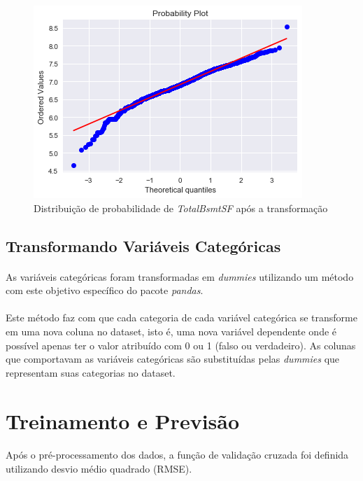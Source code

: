 \documentclass{article}
\begin{document}
			\begin{figure}[H]
				\centering
				\includegraphics[scale=0.8]{../img/totalbsmtsf_norm_after_2}
				\caption{Distribuição de probabilidade de \textit{TotalBsmtSF} após a transformação}
			\end{figure}						
						
		\subsection{Transformando Variáveis Categóricas}
			\paragraph{}As variáveis categóricas foram transformadas em \textit{dummies} utilizando um método com este objetivo específico do pacote \textit{pandas}.
			
			\paragraph{}Este método faz com que cada categoria de cada variável categórica se transforme em uma nova coluna no dataset, isto é, uma nova variável dependente onde é possível apenas ter o valor atribuído com 0 ou 1 (falso ou verdadeiro). As colunas que comportavam as variáveis categóricas são substituídas pelas \textit{dummies} que representam suas categorias no dataset.
		
		
\section{Treinamento e Previsão}
	\paragraph{}Após o pré-processamento dos dados, a função de validação cruzada foi definida utilizando desvio médio quadrado (RMSE).
\end{document}
